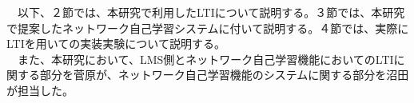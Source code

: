 　以下、２節では、本研究で利用したLTIについて説明する。３節では、本研究で提案したネットワーク自己学習システムに付いて説明する。４節では、実際にLTIを用いての実装実験について説明する。\\
　また、本研究において、LMS側とネットワーク自己学習機能においてのLTIに関する部分を菅原が、ネットワーク自己学習機能のシステムに関する部分を沼田が担当した。
